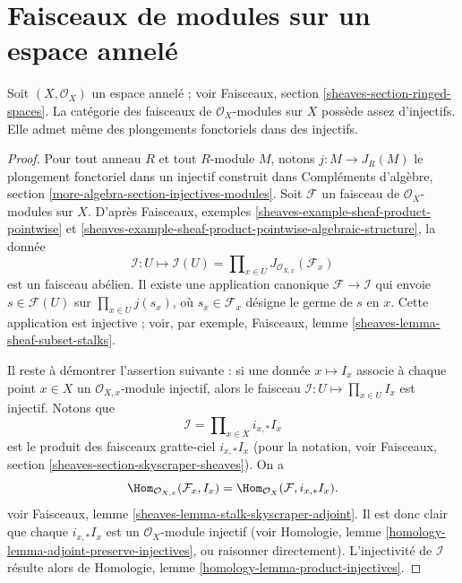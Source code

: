 \section{Faisceaux de modules sur un espace annelé}
\label{section-sheaves-modules-space}


\begin{lemma}
\label{lemma-sheaves-modules-space}
Soit $(X, \mathcal{O}_X)$ un espace annelé ; voir Faisceaux, section
\ref{sheaves-section-ringed-spaces}. La catégorie des faisceaux de
$\mathcal{O}_X$-modules sur $X$ possède assez d'injectifs. Elle admet même des
plongements fonctoriels dans des injectifs.
\end{lemma}

\begin{proof}
Pour tout anneau $R$ et tout $R$-module $M$, notons
$j : M \to J_R(M)$ le plongement fonctoriel dans un injectif construit dans
Compléments d'algèbre, section
\ref{more-algebra-section-injectives-modules}.
Soit $\mathcal{F}$ un faisceau de $\mathcal{O}_X$-modules sur $X$. D'après
Faisceaux, exemples \ref{sheaves-example-sheaf-product-pointwise} et
\ref{sheaves-example-sheaf-product-pointwise-algebraic-structure}, la donnée
$$
\mathcal{I} : U \mapsto
\mathcal{I}(U) = \prod\nolimits_{x\in U} J_{\mathcal{O}_{X, x}}(\mathcal{F}_x)
$$
est un faisceau abélien. Il existe une application canonique
$\mathcal{F} \to \mathcal{I}$ qui envoie $s \in \mathcal{F}(U)$ sur
$\prod_{x \in U} j(s_x)$, où $s_x \in \mathcal{F}_x$ désigne le germe de $s$
en $x$. Cette application est injective ; voir, par exemple, Faisceaux, lemme
\ref{sheaves-lemma-sheaf-subset-stalks}.

\medskip\noindent
Il reste à démontrer l'assertion suivante : si une donnée $x \mapsto I_x$
associe à chaque point $x \in X$ un $\mathcal{O}_{X, x}$-module injectif, alors
le faisceau $\mathcal{I} : U \mapsto \prod_{x \in U} I_x$ est injectif.
Notons que
$$
\mathcal{I} = \prod\nolimits_{x \in X} i_{x, *}I_x
$$
est le produit des faisceaux gratte-ciel $i_{x, *}I_x$ (pour la notation, voir
Faisceaux, section \ref{sheaves-section-skyscraper-sheaves}). On a
$$
\Hom_{\mathcal{O}_{X, x}}(\mathcal{F}_x, I_x)
=
\Hom_{\mathcal{O}_X}(\mathcal{F}, i_{x, *}I_x).
$$
voir Faisceaux, lemme \ref{sheaves-lemma-stalk-skyscraper-adjoint}. Il est donc
clair que chaque $i_{x, *}I_x$ est un $\mathcal{O}_X$-module injectif (voir
Homologie, lemme \ref{homology-lemma-adjoint-preserve-injectives}, ou raisonner
directement). L'injectivité de $\mathcal{I}$ résulte alors de
Homologie, lemme \ref{homology-lemma-product-injectives}.
\end{proof}













